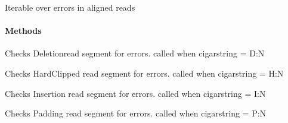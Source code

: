 \documentclass[letterpaper,10pt,english]{sphinxmanual}
\begin{document}
\begin{fulllineitems}
\label{index:proto_err.errorCount.errorReader}
Iterable over errors in aligned reads
\paragraph{Methods}

\begin{fulllineitems}
\label{index:proto_err.errorCount.errorReader.checkDeletion}
Checks Deletionread segment for  errors. called when cigarstring = D:N

\end{fulllineitems}


\begin{fulllineitems}
\label{index:proto_err.errorCount.errorReader.checkHardClipped}
Checks HardClipped read segment for errors. called when cigarstring = H:N

\end{fulllineitems}


\begin{fulllineitems}
\label{index:proto_err.errorCount.errorReader.checkInsertion}
Checks Insertion read segment for errors. called when cigarstring = I:N

\end{fulllineitems}


\begin{fulllineitems}
\label{index:proto_err.errorCount.errorReader.checkPadding}
Checks Padding read segment for errors. called when cigarstring = P:N

\end{fulllineitems}



\end{fulllineitems}
\end{document}
